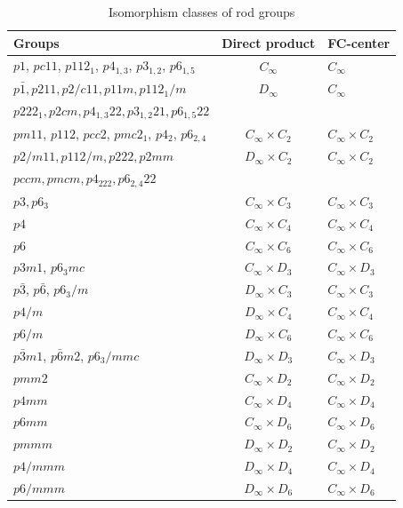 \documentclass[11pt,a4paper]{article}
\begin{document}
{\tiny
\begin{table}[H]
\begin{center}
\caption{Isomorphism classes of rod groups}
\label{t:table1}
\begin{tabular}{|l|c|l|}
\hline
Groups & Direct product & FC-center \\
\hline
$p1$, $pc11$, $p112_1$, $p4_{1,3}$, $p3_{1,2}$, $p6_{1,5}$ & $C_{\infty}$ & $C_{\infty}$ \\
\hline
$p\bar1, p211, p2/c11, p11m, p112_1/m$  & $D_{\infty}$ & $C_{\infty}$ \\
$p222_1, p2cm, p4_{1,3}22, p3_{1,2}21, p6_{1,5}22$ & & \\
\hline
$pm11$, $p112$, $pcc2$, $pmc2_1$, $p4_2$, $p6_{2,4}$ & $C_{\infty} \times C_2$ & $C_{\infty} \times C_2$ \\
\hline
$p2/m11, p112/m, p222, p2mm$ & $D_{\infty} \times C_2$ & $C_{\infty} \times C_2$ \\
$pccm, pmcm, p4_222, p6_{2,4}22$ & & \\
\hline
$p3, p6_3$ & $C_{\infty} \times C_3$ & $C_{\infty} \times C_3$\\
\hline
$p4$ & $C_{\infty} \times C_4$ & $C_{\infty} \times C_4$ \\
\hline
$p6$ & $C_{\infty} \times C_6$ & $C_{\infty} \times C_6$\\
\hline
$p3m1$, $p6_3mc$ & $C_{\infty} \times D_3$ & $C_{\infty} \times D_3$ \\
\hline
$p\bar3$, $p\bar6$, $p6_3/m$ & $D_{\infty} \times C_3$ & $C_{\infty} \times C_3$\\
\hline
$p4/m$ & $D_{\infty} \times C_4$ & $C_{\infty} \times C_4$ \\
\hline
$p6/m$ & $D_{\infty} \times C_6$ & $C_{\infty} \times C_6$ \\
\hline
$p\bar3m1$, $p\bar6m2$, $p6_3/mmc$ & $D_{\infty} \times D_3$ & $C_{\infty} \times D_3$ \\
\hline
$pmm2$ & $C_{\infty} \times D_2$ & $C_{\infty} \times D_2$ \\
\hline
$p4mm$ & $C_{\infty} \times D_4$ & $C_{\infty} \times D_4$ \\
\hline
$p6mm$ & $C_{\infty} \times D_6$ & $C_{\infty} \times D_6$ \\
\hline
$pmmm$ & $D_{\infty} \times D_2$ & $C_{\infty} \times D_2$ \\
\hline
$p4/mmm$ & $D_{\infty} \times D_4$ & $C_{\infty} \times D_4$ \\
\hline
$p6/mmm$ & $D_{\infty} \times D_6$ & $C_{\infty} \times D_6$\\

\end{tabular}
\end{center}
\end{table}}
\end{document}
